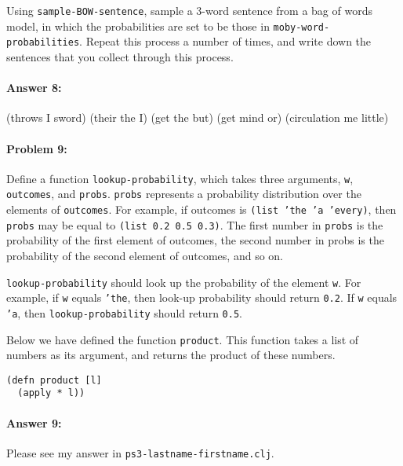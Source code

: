 \documentclass[10pt]{article}
\newcommand{\PSnum}{3}
\begin{document}
Using \texttt{sample-BOW-sentence}, sample a 3-word sentence from a
bag of words model, in which the probabilities are set to be those in
\texttt{moby-word-probabilities}. Repeat this process a number of
times, and write down the sentences that you collect through this
process.

\paragraph{Answer 8:} (throws I sword) (their the I) (get the but) (get mind or) (circulation me little)

\noindent\hrulefill %

\paragraph{Problem 9:}

Define a function \texttt{lookup-probability}, which takes three
arguments, \texttt{w}, \texttt{outcomes}, and
\texttt{probs}. \texttt{probs} represents a probability distribution
over the elements of \texttt{outcomes}. For example, if outcomes is
\texttt{(list 'the 'a 'every)}, then \texttt{probs} may be equal to
\texttt{(list 0.2 0.5 0.3)}. The first number in \texttt{probs} is the
probability of the first element of outcomes, the second number in
probs is the probability of the second element of outcomes, and so on.

\texttt{lookup-probability} should look up the probability of the
element \texttt{w}. For example, if \texttt{w} equals \texttt{'the},
then look-up probability should return \texttt{0.2}. If \texttt{w}
equals \texttt{'a}, then \texttt{lookup-probability} should return
\texttt{0.5}.

Below we have defined the function \texttt{product}. This function takes a list
of numbers as its argument, and returns the product of these numbers.

\begin{lstlisting}
(defn product [l]
  (apply * l))
\end{lstlisting}

\paragraph{Answer 9:} Please see my answer in
\texttt{ps\PSnum-lastname-firstname.clj}.

\noindent\hrulefill %
\end{document}
